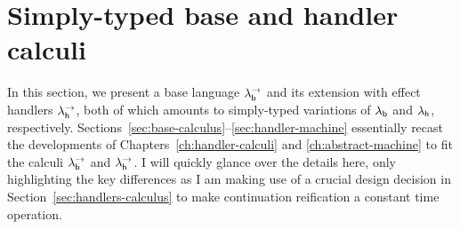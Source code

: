 \documentclass[12pt,phd,lfcs,twoside,openright,logo,leftchapter,normalheadings]{infthesis}
\theoremstyle{plain}
\theoremstyle{definition}
\begin{document}


\section{Simply-typed base and handler calculi}
\label{sec:calculi}
In this section, we present a base language $\lambda^\rightarrow_{\mathsf{b}}$ and its extension
with effect handlers $\lambda^\rightarrow_{\mathsf{h}}$, both of which amounts to simply-typed
variations of $\lambda_{\mathsf{b}}$ and $\lambda_{\mathsf{h}}$,
respectively. Sections~\ref{sec:base-calculus}--\ref{sec:handler-machine}
essentially recast the developments of
Chapters~\ref{ch:handler-calculi} and \ref{ch:abstract-machine} to fit
the calculi $\lambda^\rightarrow_{\mathsf{b}}$ and $\lambda^\rightarrow_{\mathsf{h}}$. I will quickly glance over the
details here, only highlighting the key differences as I am making use
of a crucial design decision in Section~\ref{sec:handlers-calculus} to
make continuation reification a constant time operation.
\end{document}
